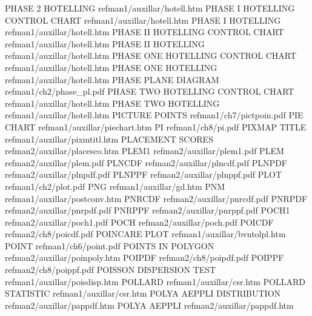 PHASE 2 HOTELLING                       refman1/auxillar/hotell.htm
PHASE I HOTELLING CONTROL CHART         refman1/auxillar/hotell.htm
PHASE I HOTELLING                       refman1/auxillar/hotell.htm
PHASE II HOTELLING CONTROL CHART        refman1/auxillar/hotell.htm
PHASE II HOTELLING                      refman1/auxillar/hotell.htm
PHASE ONE HOTELLING CONTROL CHART       refman1/auxillar/hotell.htm
PHASE ONE HOTELLING                     refman1/auxillar/hotell.htm
PHASE PLANE DIAGRAM                     refman1/ch2/phase_pl.pdf
PHASE TWO HOTELLING CONTROL CHART       refman1/auxillar/hotell.htm
PHASE TWO HOTELLING                     refman1/auxillar/hotell.htm
PICTURE POINTS                          refman1/ch7/pictpoin.pdf
PIE CHART                               refman1/auxillar/piechart.htm
PI                                      refman1/ch8/pi.pdf
PIXMAP TITLE                            refman1/auxillar/pixmtitl.htm
PLACEMENT SCORES                        refman2/auxillar/placesco.htm
PLEM1                                   refman2/auxillar/plem1.pdf
PLEM                                    refman2/auxillar/plem.pdf
PLNCDF                                  refman2/auxillar/plncdf.pdf
PLNPDF                                  refman2/auxillar/plnpdf.pdf
PLNPPF                                  refman2/auxillar/plnppf.pdf
PLOT                                    refman1/ch2/plot.pdf
PNG                                     refman1/auxillar/gd.htm
PNM                                     refman1/auxillar/postconv.htm
PNRCDF                                  refman2/auxillar/pnrcdf.pdf
PNRPDF                                  refman2/auxillar/pnrpdf.pdf
PNRPPF                                  refman2/auxillar/pnrppf.pdf
POCH1                                   refman2/auxillar/poch1.pdf
POCH                                    refman2/auxillar/poch.pdf
POICDF                                  refman2/ch8/poicdf.pdf
POINCARE PLOT                           refman1/auxillar/bvntolpl.htm
POINT                                   refman1/ch6/point.pdf
POINTS IN POLYGON                       refman2/auxillar/poinpoly.htm
POIPDF                                  refman2/ch8/poipdf.pdf
POIPPF                                  refman2/ch8/poippf.pdf
POISSON DISPERSION TEST                 refman1/auxillar/poisdisp.htm
POLLARD                                 refman1/auxillar/csr.htm
POLLARD STATISTIC                       refman1/auxillar/csr.htm
POLYA AEPPLI DISTRIBUTION               refman2/auxillar/pappdf.htm
POLYA AEPPLI                            refman2/auxillar/pappdf.htm

